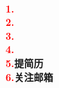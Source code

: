 \documentclass{article}
\begin{document}
\begin{CJK}{UTF8}{gkai}
\end{CJK}
\begin{CJK}{UTF8}{gbsn}
\textcolor[rgb]{1,0,0}{\begin{math} \end{math} \begin{math}			\end{math}}



\fontsize{2.5em}{2.5ex}\selectfont
\begin{center}
\textbf{
	\textcolor{red}{1.}\\
	\textcolor{red}{2.}\\
	\textcolor{red}{3.}\\
	\textcolor{red}{4.}\\
	\textcolor{red}{5.}提简历\\
	\textcolor{red}{6.}关注邮箱\\
}
\end{center}
\end{CJK}
\end{document}
